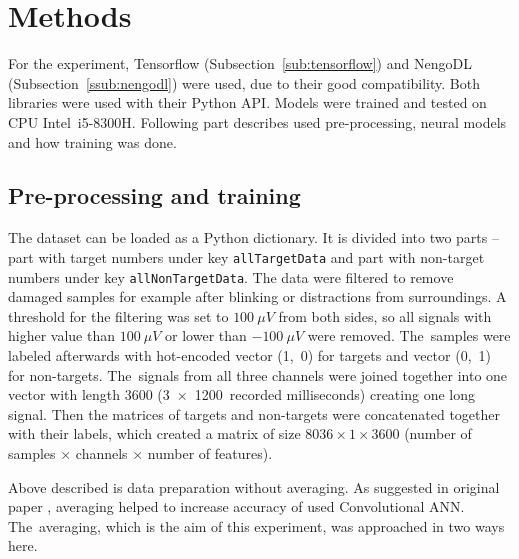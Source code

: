 %
%

\section{Methods}%
\label{sec:methods}

For the experiment, Tensorflow (Subsection~\ref{sub:tensorflow}) and NengoDL (Subsection~\ref{ssub:nengodl}) were used, due to their good compatibility. Both libraries were used with their Python API. Models were trained and tested on CPU Intel~i5-8300H. Following part describes used pre-processing, neural models and how training was done.

%
%

\subsection{Pre-processing and training}%
\label{ssec:preproc_train}

The dataset \cite{dataset} can be loaded as a Python dictionary. It is divided into two parts -- part with target numbers under key \texttt{allTargetData} and part with non-target numbers under key \texttt{allNonTargetData}. The data were filtered to remove damaged samples for example after blinking or distractions from surroundings. A threshold for the filtering was set to $100\ \mu V$ from both sides, so all signals with higher value than $100\ \mu V$ or lower than $-100\ \mu V$ were removed. The~samples were labeled afterwards with hot-encoded vector (1,~0) for targets and vector (0,~1) for non-targets. The~signals from all three channels were joined together into one vector with length 3600 (3~$\times$~1200~recorded milliseconds) creating one long signal. Then the matrices of targets and non-targets were concatenated together with their labels, which created a matrix of size $8036 \times 1 \times 3600$ (number of samples $\times$ channels $\times$ number of features).

Above described is data preparation without averaging. As suggested in original paper \cite{varekap300}, averaging helped to increase accuracy of used Convolutional ANN. The~averaging, which is the aim of this experiment, was approached in two ways here.

